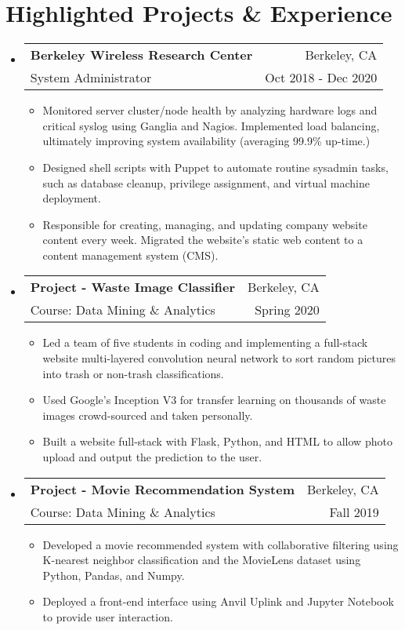 \documentclass[letterpaper,11pt]{article}
\makeatletter
\newcommand{\resumeSubheading}[4]{
	\vspace{-1pt}\item
	\begin{tabular*}{0.97\textwidth}{l@{\extracolsep{\fill}}r}
		\textbf{#1} & #2 \\
		\small#3 & \small #4 \\
	\end{tabular*}\vspace{-5pt}
}
\newcommand{\resumeSubHeadingListStart}{\begin{itemize}[leftmargin=*]}
\newcommand{\resumeSubHeadingListEnd}{\end{itemize}}
\makeatother
\begin{document}
	\section{Highlighted Projects \& Experience}
	\resumeSubHeadingListStart
	\resumeSubheading
	{Berkeley Wireless Research Center}{Berkeley, CA}
	{System Administrator}{Oct 2018 - Dec 2020}
	\begin{itemize}
		\item {Monitored server cluster/node health by analyzing hardware logs and critical syslog using Ganglia and Nagios. Implemented load balancing, ultimately improving system availability (averaging 99.9\% up-time.)}
		\item {Designed shell scripts with Puppet to automate routine sysadmin tasks, such as database cleanup, privilege assignment, and virtual machine deployment.}
		\item {Responsible for creating, managing, and updating company website content every week. Migrated the website's static web content to a content management system (CMS).}
	\end{itemize}
	
	\resumeSubheading
	{Project - Waste Image Classifier}{Berkeley, CA}
	{Course: Data Mining \& Analytics}{Spring 2020}
	\begin{itemize}
		\item {Led a team of five students in coding and implementing a full-stack website multi-layered convolution neural network to sort random pictures into trash or non-trash classifications.}
		\item {Used Google's Inception V3 for transfer learning on thousands of waste images crowd-sourced and taken personally.}
		\item {Built a website full-stack with Flask, Python, and HTML to allow photo upload and output the prediction to the user.}
	\end{itemize}
	\resumeSubheading
	{Project - Movie Recommendation System}{Berkeley, CA}
	{Course: Data Mining \& Analytics}{Fall 2019}
	\begin{itemize}
		\item {Developed a movie recommended system with collaborative filtering using K-nearest neighbor classification and the MovieLens dataset using Python, Pandas, and Numpy.}
		\item {Deployed a front-end interface using Anvil Uplink and Jupyter Notebook to provide user interaction.}
	\end{itemize}
	\resumeSubHeadingListEnd
	
\end{document}
